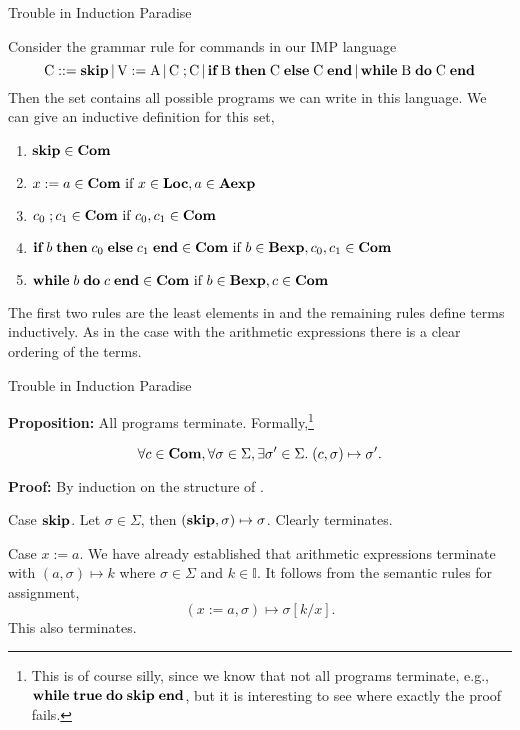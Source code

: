 \documentclass{beamer}
\begin{document}
\begin{frame}{Trouble in Induction Paradise}

\scriptsize
Consider the grammar rule for commands in our IMP language
\[
\mbox{C} ::= \mbox{\bf skip} \,|\, \mbox{V} := \mbox{A} \,|\,\mbox{C}\; ; \mbox{C} \,|\,
	\mbox{\bf if} \; \mbox{B}\; \mbox{\bf then}\;\mbox{C}\; \mbox{\bf else}\; \mbox{C} \; \mbox{\bf end}\,|\,
	\mbox{\bf while}\; \mbox{B}\; \mbox{\bf  do}\; \mbox{C}\; \mbox{\bf end}
\]
Then the set  contains all possible programs we can write in this language.  We can give an
inductive definition for this set,
\begin{enumerate}
\item $\mbox{\bf skip}\in \mbox{\bf Com}$
\item $x := a \in \mbox{\bf Com} \mbox{ if } x\in \mbox{\bf Loc}, a\in\mbox{\bf Aexp}$
\item $c_0\; ; c_1 \in \mbox{\bf Com} \mbox{ if } c_0, c_1 \in \mbox{\bf Com}$
\item $\mbox{\bf if} \; b\; \mbox{\bf then}\;c_0\; \mbox{\bf else}\; c_1\; \mbox{\bf end} \in\mbox{\bf Com} \mbox{ if } b\in\mbox{\bf Bexp}, c_0, c_1\in 
\mbox{\bf Com}$
\item $\mbox{\bf while}\; b\; \mbox{\bf do}\; c\; \mbox{\bf end} \in\mbox{\bf Com} \mbox{ if } b\in\mbox{\bf Bexp}, c\in 
\mbox{\bf Com}$
\end{enumerate}

The first two rules are the least elements in  and the remaining rules define terms inductively.
As in the case with the arithmetic expressions there is a clear ordering of the terms.
\end{frame}

\begin{frame}{Trouble in Induction Paradise}

\scriptsize
{\bf Proposition:} All programs terminate.  Formally,\footnote{\tiny This is of course silly, since we know that not all programs terminate, e.g., ${\bf while}\; {\mbox{\bf true}}\;{\bf do}\;{\mbox{\bf skip}}\; \mbox{\bf end}$, but
it is interesting to see where exactly the proof fails.}

\[
\forall c \in\mbox{\bf Com}, \forall \sigma\in\Sigma,\exists \sigma' \in\Sigma.\; (c,\sigma)\mapsto \sigma'.
\]

\vspace{.1in}
{\bf Proof:} By induction on the structure of .

\vspace{.1in}
Case $\mbox{\bf skip}$. Let $\sigma\in\Sigma$, then $(\mbox{\bf skip}, \sigma)\mapsto \sigma$. Clearly terminates.

\vspace{.1in}
Case $x := a$. We have already established that arithmetic expressions terminate with $(a,\sigma)\mapsto k$
where $\sigma\in\Sigma$ and $k \in \mathbb{I}$.  It follows from the semantic rules for assignment,
\[
(x := a,\sigma)\mapsto \sigma[k/x].
\]
This also terminates.

\end{frame}
\end{document}
